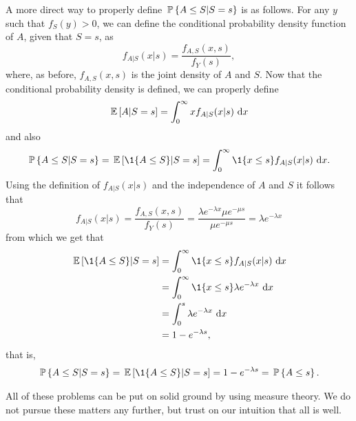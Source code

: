 \begin{question}
\begin{solution}
A more direct way to properly define $\P{A\leq S| S=s}$ is as follows. For any $y$ such that $f_S(y) > 0$, we can define the conditional probability density function of $A$, given that $S=s$, as 
\begin{equation*}
  f_{A|S}(x|s) = \frac{f_{A, S}( x, s)}{f_Y(s)},
\end{equation*}
where, as before, $f_{A, S}( x, s)$ is the joint density of $A$ and $S$. Now that the conditional probability density is defined, we can properly define
\begin{equation*}
  \E {A| S=s } = \int_0^\infty x   f_{A|S}(x|s)\, \d x
\end{equation*}
and also
\begin{equation*}
  \begin{split}
  \P{A\leq S| S=s } = \E{\1{A \leq S}| S=s } = \int_0^\infty \1{x \leq s}   f_{A|S}(x|s)\, \d x.
  \end{split}
\end{equation*}
Using the definition of $f_{A|S}(x|s)$ and the independence of $A$ and $S$ it follows that
\begin{equation*}
  f_{A|S}(x|s) = \frac{f_{A, S}( x, s)}{f_Y(s)} = \frac{\lambda e^{-\lambda x} \mu e^{-\mu s}}{\mu e^{-\mu s}} = \lambda e^{-\lambda x}
\end{equation*}
from which we get that 
\begin{equation*}
  \begin{split}
  \E{\1{A \leq S}| S=s } 
&= \int_0^\infty \1{x \leq s}   f_{A|S}(x|s)\, \d x \\
&= \int_0^\infty \1{x \leq s} \lambda e^{-\lambda x}\, \d x \\
&= \int_0^s \lambda e^{-\lambda x}\, \d x \\
&= 1 - e^{-\lambda s},
  \end{split}
\end{equation*}
that is,
\begin{equation*}
  \begin{split}
  \P{A\leq S| S=s} = \E{\1{A \leq S}| S=s } = 1 - e^{-\lambda s}  = \P{A \leq s}.
  \end{split}
\end{equation*}

All of these problems can be put on solid ground by using measure
theory. We do not pursue these matters any further, but trust on our
intuition that all is well.

\end{solution}
\end{question}


